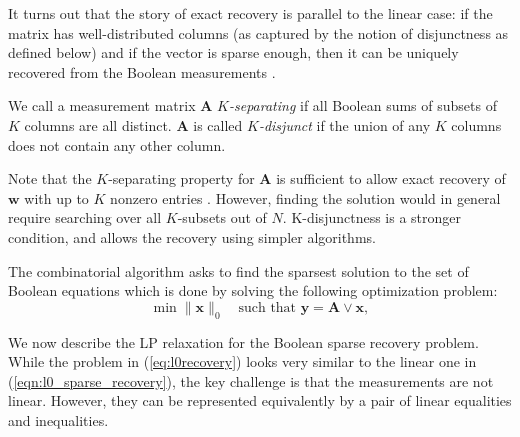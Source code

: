 It turns out that the story of exact recovery is parallel to the linear case:
if the matrix has well-distributed columns (as captured by the notion of disjunctness as 
defined below) and if the vector is sparse enough, then it can be uniquely recovered from the
Boolean measurements \cite{group_testing}.

\begin{definition}
We call a measurement matrix $\mathbf{A}$ {\em $K$-separating}
if all Boolean sums of subsets of $K$ columns are all distinct.
$\mathbf{A}$ is called {\em $K$-disjunct} if the union of any
$K$ columns does not contain any other column.
\end{definition}

Note that the $K$-separating property for $\mathbf{A}$ is sufficient
to allow exact recovery of $\mathbf{w}$ with up to $K$ nonzero entries
\cite{book2_group_testing}. However, finding the solution would
in general require searching over all $K$-subsets out of $N$. K-disjunctness
is a stronger condition, and allows the recovery using simpler algorithms.

The combinatorial algorithm asks to find the sparsest solution to the
set of Boolean equations which is done by solving the following optimization problem:
\begin{equation}
\label{eq:l0recovery}
	\min \|\mathbf{x}\|_0 \quad {\textrm{such that }}\mathbf{y} = \mathbf{A} \lor \mathbf{x},
\end{equation}

We now describe the LP relaxation for the Boolean sparse recovery problem. While
the problem in (\ref{eq:l0recovery}) looks very similar to the linear one in
(\ref{eqn:l0_sparse_recovery}), the key challenge is that the measurements are not linear. However, they can be represented equivalently by a pair of linear equalities and inequalities.

